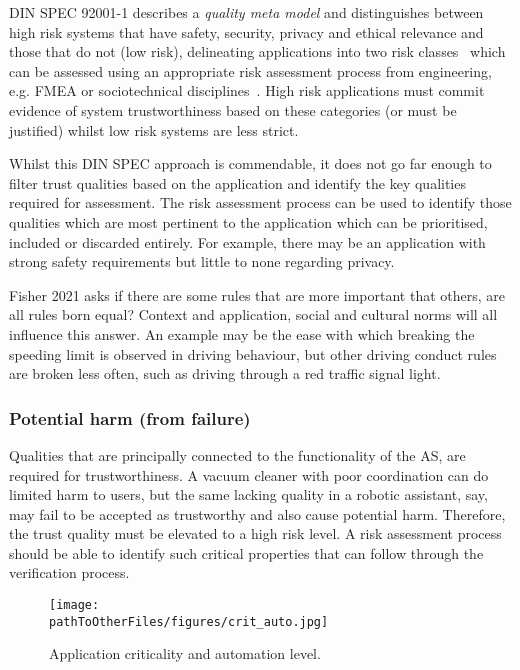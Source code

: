DIN SPEC 92001-1 describes a \emph{quality meta model} and distinguishes between high risk systems that have safety, security, privacy and ethical relevance and those that do not (low risk), delineating applications into two risk classes~\cite{Englisch2019} which can be assessed using an appropriate risk assessment process from engineering, e.g. FMEA or sociotechnical disciplines~\cite{macrae2021learning}. High risk applications must commit evidence of system trustworthiness based on these categories (or must be justified) whilst low risk systems are less strict. 

Whilst this DIN SPEC approach is commendable, it does not go far enough to filter trust qualities based on the application and identify the key qualities required for assessment. The risk assessment process can be used to identify those qualities which are most pertinent to the application which can be prioritised, included or discarded entirely. For example, there may be an application with strong safety requirements but little to none regarding privacy. 

Fisher 2021 asks if there are some rules that are more important that others, are all rules born equal? Context and application, social and cultural norms will all influence this answer. An example may be the ease with which breaking the speeding limit is observed in driving behaviour, but other driving conduct rules are broken less often, such as driving through a red traffic signal light.

\subsubsection{Potential harm (from failure)} \label{sec:app-harm}

Qualities that are principally connected to the functionality of the AS, are required for trustworthiness. A vacuum cleaner with poor coordination can do limited harm to users, but the same lacking quality in a robotic assistant, say, may fail to be accepted as trustworthy and also cause potential harm. Therefore, the trust quality must be elevated to a high risk level.
%
A risk assessment process should be able to identify such critical properties that can follow through the verification process. 

\begin{figure}[]
    \centering
    \texttt{[image: \\pathToOtherFiles/figures/crit\_auto.jpg]}
    \caption{Application criticality and automation level.}
    \label{fig:critauto}
\end{figure}


